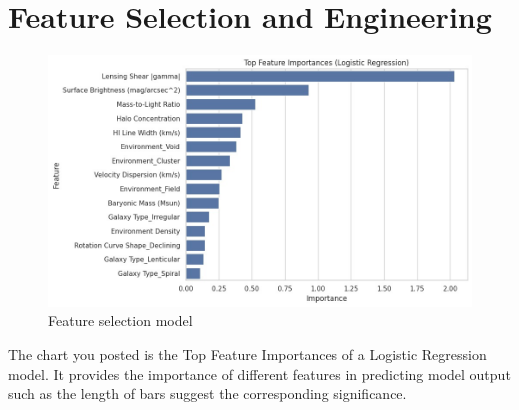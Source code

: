 \section{Feature Selection and Engineering}

 

 \begin{figure}[H]
     \centering
     \includegraphics[width=1\linewidth]{image.png}
     \caption{Feature selection model}
     \label{fig:placeholder}
 \end{figure}
The chart you posted is the Top Feature Importances of a Logistic Regression model. It provides the importance of different features in predicting model output such as the length of bars suggest the corresponding significance.

